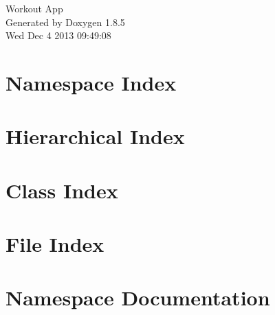 \documentclass[twoside]{book}
\newcommand{\clearemptydoublepage}{%
  \newpage{\pagestyle{empty}\cleardoublepage}%
}
\begin{document}
\hypersetup{pageanchor=false}
\begin{titlepage}
\vspace*{7cm}
\begin{center}%
{\Large Workout App }\\
\vspace*{1cm}
{\large Generated by Doxygen 1.8.5}\\
\vspace*{0.5cm}
{\small Wed Dec 4 2013 09:49:08}\\
\end{center}
\end{titlepage}
\clearemptydoublepage
\tableofcontents
\clearemptydoublepage
{}
\hypersetup{pageanchor=true}

\chapter{Namespace Index}

\chapter{Hierarchical Index}

\chapter{Class Index}

\chapter{File Index}

\chapter{Namespace Documentation}






\end{document}
